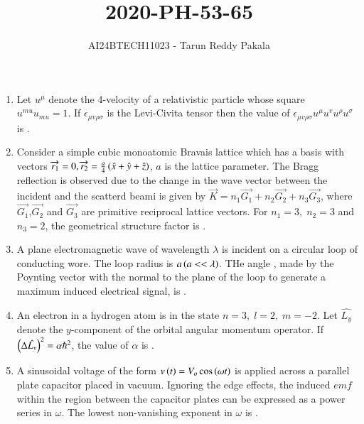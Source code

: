 \documentclass[journal,12pt,onecolumn]{IEEEtran}
\title{2020-PH-53-65}
\author{AI24BTECH11023 - Tarun Reddy Pakala}
\theoremstyle{remark}
\begin{document}


\maketitle
\bigskip
\renewcommand{\thefigure}{\theenumi}
\renewcommand{\thetable}{\theenumi}
\begin{enumerate}[start=53]
\item Let $u^{\mu}$ denote the 4-velocity of a relativistic particle whose square $u^{mu}u_{mu}=1$. If $\epsilon_{\mu v\rho \sigma}$ is the Levi-Civita tensor then the value of $\epsilon_{\mu v\rho \sigma} u^{\mu} u^v u^{\rho} u^{\sigma}$ is \underline{\hspace{2cm}}.
\item Consider a simple cubic monoatomic Bravais lattice which has a basis with vectors $\overrightarrow{r_1}=0,\overrightarrow{r_2}=\frac{a}{4}\left(\hat{x}+\hat{y}+\hat{z}\right)$, $a$ is the lattice parameter. The Bragg reflection is observed due to the change in the wave vector between the incident and the scatterd beami is given by $\overrightarrow{K}=n_1\overrightarrow{G_1}+n_2\overrightarrow{G_2}+n_3\overrightarrow{G_3}$, where $\overrightarrow{G_1}$,$\overrightarrow{G_2}$ and $\overrightarrow{G_3}$ are primitive reciprocal lattice vectors. For $n_1=3,\;n_2=3$ and $n_3=2$, the geometrical structure factor is \underline{\hspace{2cm}}.
\item A plane electromagnetic wave of wavelength $\lambda$ is incident on a circular loop of conducting wore. The loop radius is $a\left(a<<\lambda\right)$. THe angle , made by the Poynting vector with the normal to the plane of the loop to generate a maximum induced electrical signal, is \underline{\hspace{2cm}}.
\item An electron in a hydrogen atom is in the state $n=3,\;l=2,\;m=-2$. Let $\hat{L_y}$ denote the $y$-component of the orbital angular momentum operator. If $\left(\Delta\hat{L_y}\right)^2=\alpha\hbar^2$, the value of $\alpha$ is \underline{\hspace{2cm}}.
\item A sinusoidal voltage of the form $v\left(t\right)=V_o\cos\left(\omega t\right)$ is applied across a parallel plate capacitor placed in vacuum. Ignoring the edge effects, the induced $emf$ within the region between the capacitor plates can be expressed as a power series in $\omega$. The lowest non-vanishing exponent in $\omega$ is \underline{\hspace{2cm}}.

\end{enumerate}
\end{document}

